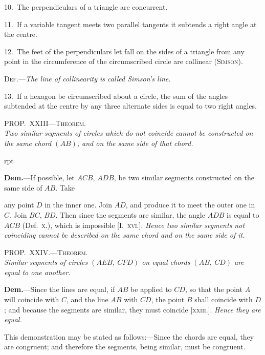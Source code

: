 \documentclass[oneside]{book}
\newcounter{wrapwidth}
\newcommand\myprop[2]{
\bigskip\Needspace*{4\baselineskip}\begin{center}\textsc{#1}\\\medskip\emph{#2}\par\end{center}
}
\newcommand\imgflow[3]{
\setcounter{wrapwidth}{#1}

\begin{wrapfigure}[#2]{r}{\value{wrapwidth}pt}
\begin{center}
\vspace{-0.3in}

\end{center}
\end{wrapfigure}
}
\newcommand\imgcent[2]{
\begin{center}

\end{center}
}
\begin{document}
\begin{footnotesize}
10.~The perpendiculars of a triangle are concurrent.

11.~If a variable tangent meets two parallel tangents it subtends
a right angle at the centre.

12.~The feet of the perpendiculars let fall on the sides of a
triangle from any point in the circumference of the circumscribed
circle are collinear (\textsc{Simson}).

\textsc{Def.}---\emph{The line of collinearity is called Simson's line.}

13.~If a hexagon be circumscribed about a circle, the sum of
the angles subtended at the centre by any three alternate sides is
equal to two right angles.
\par\end{footnotesize}

\myprop{PROP\@.~XXIII---Theorem.}{Two similar segments of circles which do not coincide
cannot be constructed on the same chord $(AB)$, and on the
same side of that chord.}


\imgflow{145}{5}{f130}

\textbf{Dem.}---If possible, let $ACB$, $ADB$, be two similar
segments constructed on the same side of $AB$. Take

any point $D$ in the inner one. Join $AD$, and produce
it to meet the outer one in $C$.
Join $BC$, $BD$. Then since
the segments are similar,
the angle $ADB$ is equal to
$ACB$ (Def.~\textsc{x.}), which is impossible
[I.~\textsc{xvi.}]. \emph{Hence two similar segments not coinciding
cannot be described on the same chord and on the
same side of it.}

\myprop{PROP\@.~XXIV\@.---Theorem.}{Similar segments of circles $(AEB,\ CFD)$ on equal chords
$(AB,\ CD)$ are equal to one another.}


\imgcent{300}{f131}

\textbf{Dem.}---Since the lines are equal, if $AB$ be applied
to $CD$, so that the point $A$ will coincide with $C$, and
the line $AB$ with $CD$, the point $B$ shall coincide with
$D$; and because the segments are similar, they must
coincide [\textsc{xxiii.}]. \emph{Hence they are equal.}\par\medskip

\begin{footnotesize}
This demonstration may be stated as follows:---Since the chords
are equal, they are congruent; and therefore the segments, being
similar, must be congruent.
\par\end{footnotesize}
\end{document}
